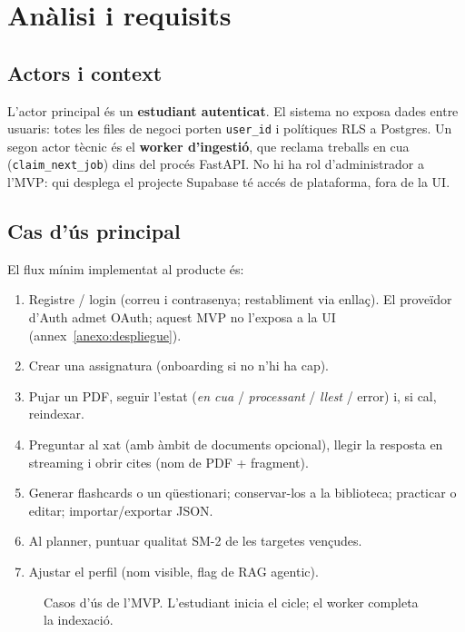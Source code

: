 \chapter{Anàlisi i requisits}
\label{cap:requisitos}

\section{Actors i context}

L'actor principal és un \textbf{estudiant autenticat}. El sistema no exposa dades entre usuaris: totes les files de negoci porten \texttt{user\_id} i polítiques RLS a Postgres. Un segon actor tècnic és el \textbf{worker d'ingestió}, que reclama treballs en cua (\texttt{claim\_next\_job}) dins del procés FastAPI. No hi ha rol d'administrador a l'MVP: qui desplega el projecte Supabase té accés de plataforma, fora de la UI.

\section{Cas d'ús principal}

El flux mínim implementat al producte és:

\begin{enumerate}
  \item Registre / login (correu i contrasenya; restabliment via enllaç). El proveïdor d'Auth admet OAuth; aquest MVP no l'exposa a la UI (annex~\ref{anexo:despliegue}).
  \item Crear una assignatura (onboarding si no n'hi ha cap).
  \item Pujar un PDF, seguir l'estat (\emph{en cua} / \emph{processant} / \emph{llest} / error) i, si cal, reindexar.
  \item Preguntar al xat (amb àmbit de documents opcional), llegir la resposta en streaming i obrir cites (nom de PDF + fragment).
  \item Generar flashcards o un qüestionari; conservar-los a la biblioteca; practicar o editar; importar/exportar JSON.
  \item Al planner, puntuar qualitat SM-2 de les targetes vençudes.
  \item Ajustar el perfil (nom visible, flag de RAG agentic).
\end{enumerate}

\begin{figure}[htbp]
\centering

\caption{Casos d'ús de l'MVP. L'estudiant inicia el cicle; el worker completa la indexació.}
\label{fig:usecases}
\end{figure}

